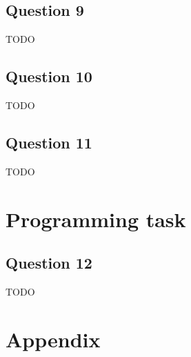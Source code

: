 \documentclass{article}
\begin{document}
\subsection{Question 9}
TODO

\subsection{Question 10}
TODO

\subsection{Question 11}
TODO

\section{Programming task}

\subsection{Question 12}
TODO

\newpage
\appendix

\section{Appendix}
\end{document}
